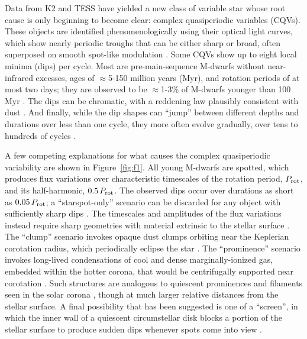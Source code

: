 \documentclass[11pt,twocolumn,tighten]{aastex63}
\begin{document}
Data from K2 and TESS have yielded a new class of variable star whose
root cause is only beginning to become clear: complex quasiperiodic
variables (CQVs).  These objects are identified phenomenologically
using their optical light curves, which show nearly periodic troughs
that can be either sharp or broad, often superposed on smooth
spot-like modulation
\citep{2017AJ....153..152S,2018AJ....155...63S,2019ApJ...876..127Z}.
Some CQVs show up to eight local minima (dips) per cycle.  Most are
pre-main-sequence M-dwarfs without near-infrared excesses, ages of
$\approx$5-150 million years (Myr), and rotation periods of at most
two days; they are observed to be $\approx$1-3\% of M-dwarfs younger
than 100 Myr \citep{2016AJ....152..114R,2022AJ....163..144G}.  The
dips can be chromatic, with a reddening law plausibly consistent with
dust
\citep{2020AJ....160...86B,2022AJ....163..144G,2023MNRAS.518.2921K}.
And finally, while the dip shapes can ``jump'' between different
depths and durations over less than one cycle, they more often evolve
gradually, over tens to hundreds of cycles
\citep[e.g.][]{2017AJ....153..152S,2022ApJ...925...75P,2023ApJ...945..114P}.

A few competing explanations for what causes the complex quasiperiodic
variability are shown in Figure~\ref{fig:f1}.  All young M-dwarfs are spotted, which
produces flux variations over characteristic timescales of the
rotation period, $P_{\rm rot}$, and its half-harmonic, $0.5\,P_{\rm
rot}$.  The observed dips occur over durations as short as
$0.05\,P_{\rm rot}$; a ``starspot-only'' scenario can be discarded for
any object with sufficiently sharp dips
\citep{2017AJ....153..152S,2021MNRAS.500.1366K}.   The timescales and
amplitudes of the flux variations instead require sharp geometries
with material extrinsic to the stellar surface
\citep[e.g.][]{2017AJ....153..152S,2022AJ....163..144G}.  The
``clump'' scenario invokes opaque dust clumps orbiting near the
Keplerian corotation radius, which periodically eclipse the star
\citep{2017AJ....153..152S,2023MNRAS.518.4734S}.  The ``prominence''
scenario invokes long-lived condensations of cool and dense
marginally-ionized gas, embedded within the hotter corona, that would
be centrifugally supported near corotation
\citep{1989MNRAS.238..657C,2019MNRAS.482.2853J,2022MNRAS.514.5465W}.
Such structures are analogous to quiescent prominences and filaments
seen in the solar corona \citep[see e.g.][]{2015ASSL..415.....V},
though at much larger relative distances from the stellar surface.  A
final possibility that has been suggested is one of a ``screen'', in
which the inner wall of a quiescent circumstellar disk blocks a
portion of the stellar surface to produce sudden dips whenever spots
come into view \citep{2019ApJ...876..127Z}.  
\end{document}
